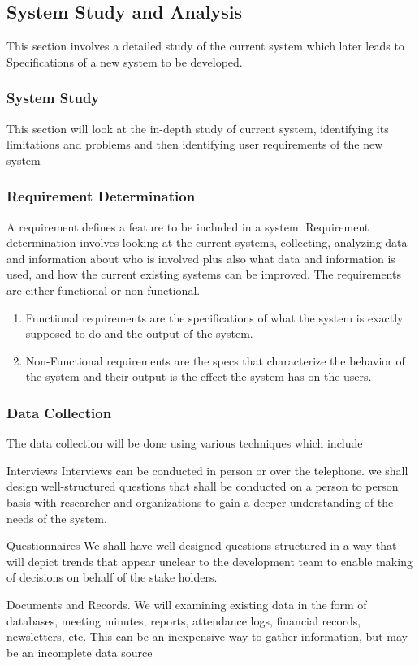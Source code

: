 \documentclass[a4paper,12pt]{article}
\begin{document}
\subsection{System Study and Analysis}
This section involves a detailed study of the current system which later leads to
Specifications of a new system to be developed. 

\subsubsection{System Study}
This section will look at the in-depth study of current system, identifying its limitations and problems and then identifying user requirements of the new system

\subsubsection{Requirement Determination}
A requirement defines a feature to be included in a system. Requirement determination involves looking at the current systems, collecting, analyzing data and information about who is involved plus also what data and information is used, and how the current existing systems can be improved. The requirements are either functional or non-functional.
\begin{enumerate}[label=(\roman*)]
\item Functional requirements are the specifications of what the system is exactly supposed to do and the output of the system.

\item Non-Functional requirements are the specs that characterize the behavior of the system and their output is the effect the system has on the users.
\end{enumerate}

\subsubsection{Data Collection}
The data collection will be done using various techniques which include

\par
Interviews
Interviews can be conducted in person or over the telephone. we shall design well-structured questions that shall be conducted on a person to person basis with researcher and organizations to gain a deeper understanding of the needs of the system.

\par
Questionnaires
We shall have well designed questions structured in a way that will depict trends that appear unclear to the development team to enable making of decisions on behalf of the stake holders.
\par
Documents and Records.
We will examining existing data in the form of databases, meeting minutes, reports, attendance logs, financial records, newsletters, etc. This can be an inexpensive way to gather information, but may be an incomplete data source 
\end{document}
